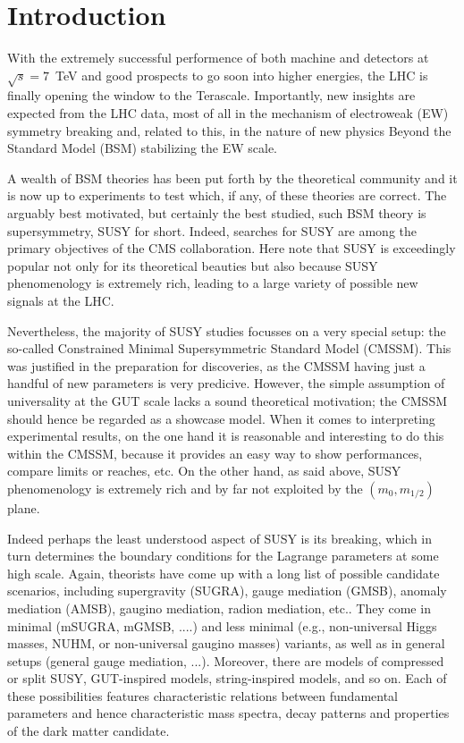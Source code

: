 \section{Introduction}
\label{sec:intro}

With the extremely successful performence of both machine and detectors
at $\sqrt{s}=7$~TeV and good prospects to go soon into higher energies, 
the LHC is finally opening the window to the Terascale. 
Importantly, new insights are expected from the 
LHC data, most of all in the mechanism of electroweak (EW) symmetry 
breaking and, related to this, in the nature of new physics Beyond 
the Standard Model (BSM) stabilizing the EW scale. 

A wealth of BSM theories has been put forth by the theoretical community 
 and it is now up to experiments to test which, if any, of these theories are correct. 
The arguably best motivated, but certainly the best studied, such BSM 
theory is supersymmetry, SUSY for short. Indeed, searches for SUSY are 
among the primary objectives of the CMS collaboration. Here note that 
SUSY is exceedingly popular not only for its theoretical beauties but 
also because SUSY phenomenology is extremely rich, 
leading to a large variety of possible new signals at the LHC. 

Nevertheless, the majority of SUSY studies focusses on a very special 
setup: the so-called Constrained Minimal Supersymmetric Standard Model (CMSSM). 
This was justified in the preparation for discoveries, as the CMSSM 
having just a handful of new parameters is very predicive. However, 
the simple assumption of universality at the GUT scale lacks a sound 
theoretical motivation; the CMSSM should hence be regarded as a showcase 
model. When it comes to interpreting experimental results, on the 
one hand it is reasonable and interesting to do this within the CMSSM, 
because it provides an easy way to show performances, compare limits 
or reaches, etc. On the other hand, as said above, SUSY phenomenology 
is extremely rich and by far not exploited by the $(m_0,m_{1/2})$ plane.

Indeed perhaps the least understood aspect of SUSY is its breaking, 
which in turn determines the boundary conditions for the Lagrange 
parameters at some high scale. Again, theorists have come up with a 
long list of possible candidate scenarios, including 
supergravity (SUGRA), 
gauge mediation (GMSB), 
anomaly mediation (AMSB), 
gaugino mediation, radion mediation, etc.. 
They come in minimal (mSUGRA, mGMSB, ....) and  
less minimal (e.g., non-universal Higgs masses, NUHM,  
or non-universal gaugino masses) variants, as well as in general setups 
(general gauge mediation, ...). 
Moreover, there are models of compressed or split SUSY, 
GUT-inspired models, string-inspired models, and so on. 
Each of these possibilities features characteristic relations between 
fundamental parameters and hence characteristic mass spectra, decay 
patterns and properties of the dark matter candidate. 

